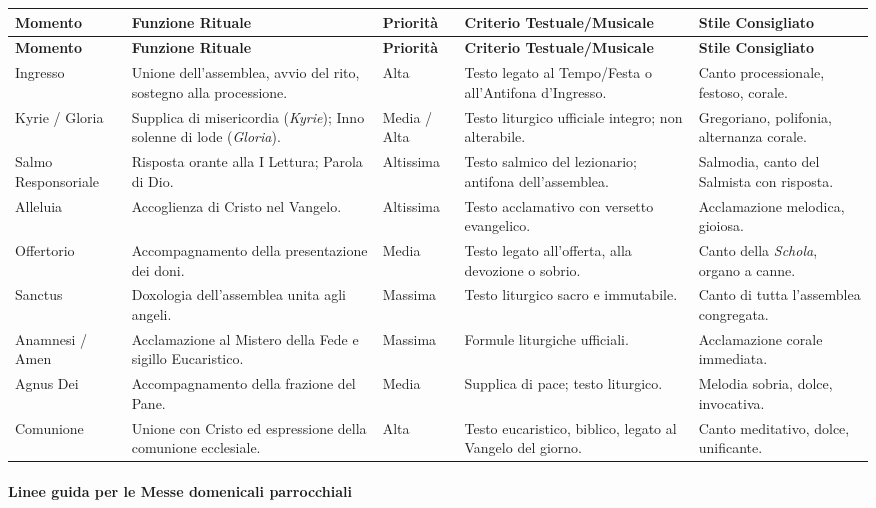 \documentclass[12pt,a4paper]{article}
\begin{document}
	\begin{longtable}{L{2.5cm}L{3cm}L{2cm}L{3.5cm}L{2.5cm}}
		\toprule
		\textbf{Momento} & \textbf{Funzione Rituale} & \textbf{Priorità} & \textbf{Criterio Testuale/Musicale} & \textbf{Stile Consigliato} \\
		\midrule
		\endfirsthead
		\toprule
		\textbf{Momento} & \textbf{Funzione Rituale} & \textbf{Priorità} & \textbf{Criterio Testuale/Musicale} & \textbf{Stile Consigliato} \\
		\midrule
		\endhead
		\bottomrule
		\endlastfoot
		Ingresso & Unione dell'assemblea, avvio del rito, sostegno alla processione. & Alta & Testo legato al Tempo/Festa o all'Antifona d'Ingresso. & Canto processionale, festoso, corale. \\
		Kyrie / Gloria & Supplica di misericordia (\emph{Kyrie}); Inno solenne di lode (\emph{Gloria}). & Media / Alta & Testo liturgico ufficiale integro; non alterabile. & Gregoriano, polifonia, alternanza corale. \\
		Salmo Responsoriale & Risposta orante alla I Lettura; Parola di Dio. & Altissima & Testo salmico del lezionario; antifona dell'assemblea. & Salmodia, canto del Salmista con risposta. \\
		Alleluia & Accoglienza di Cristo nel Vangelo. & Altissima & Testo acclamativo con versetto evangelico. & Acclamazione melodica, gioiosa. \\
		Offertorio & Accompagnamento della presentazione dei doni. & Media & Testo legato all'offerta, alla devozione o sobrio. & Canto della \emph{Schola}, organo a canne. \\
		Sanctus & Doxologia dell'assemblea unita agli angeli. & Massima & Testo liturgico sacro e immutabile. & Canto di tutta l'assemblea congregata. \\
		Anamnesi / Amen & Acclamazione al Mistero della Fede e sigillo Eucaristico. & Massima & Formule liturgiche ufficiali. & Acclamazione corale immediata. \\
		Agnus Dei & Accompagnamento della frazione del Pane. & Media & Supplica di pace; testo liturgico. & Melodia sobria, dolce, invocativa. \\
		Comunione & Unione con Cristo ed espressione della comunione ecclesiale. & Alta & Testo eucaristico, biblico, legato al Vangelo del giorno. & Canto meditativo, dolce, unificante. \\
	\end{longtable}
	
	\paragraph{Linee guida per le Messe domenicali parrocchiali}\label{linee-guida-per-le-messe-domenicali-parrocchiali}
	
\end{document}
